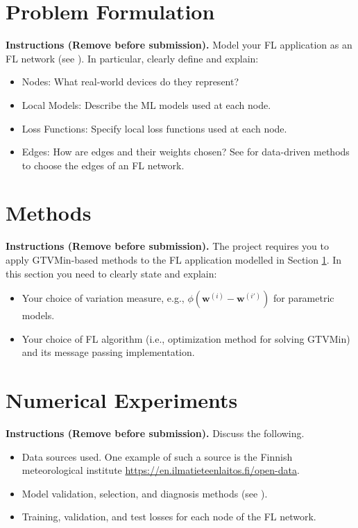 \documentclass[9pt]{article}
\begin{document}
	\section{Problem Formulation}
	\label{sec:pf}
	{\bf Instructions (Remove before submission).}
		Model your FL application as an FL network (see \cite[Ch.~3]{Jung2025}). 
		In particular, clearly define and explain:
		\begin{itemize}
			\item Nodes: What real-world devices do they represent?
			\item Local Models: Describe the ML models used at each node.
			\item Loss Functions: Specify local loss functions used at each node.
			\item Edges: How are edges and their weights chosen? See \cite[Ch. 7]{Jung2025} for 
			data-driven methods to choose the edges of an FL network. 
		\end{itemize}
	
	\section{Methods}
	\label{sec:methods}
{\bf Instructions (Remove before submission).}
	The project requires you to apply GTVMin-based methods to 
	the FL application modelled in Section \ref{sec:pf}. In this section 
	you need to clearly state and explain:
		\begin{itemize}
			\item Your choice of variation measure, e.g., $\phi(\mathbf{w}^{(i)}-\mathbf{w}^{(i')})$ 
			for parametric models. 
			\item Your choice of FL algorithm (i.e., optimization method for solving 
			GTVMin) and its message passing implementation.
		\end{itemize}
	
	\section{Numerical Experiments}
	\label{sec:experiments}
	{\bf Instructions (Remove before submission).}
	Discuss the following.  
		\begin{itemize}
			\item Data sources used. One example of such a source is the Finnish meteorological institute \url{https://en.ilmatieteenlaitos.fi/open-data}. 
			\item Model validation, selection, and diagnosis methods (see \cite[Sec.~6.6]{Jung2022}).
			\item Training, validation, and test losses for each node of the FL network. 
		\end{itemize}
	
\end{document}

